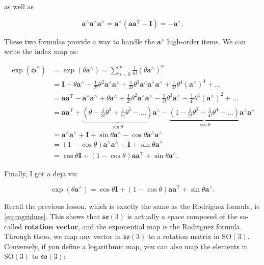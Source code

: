 as well as

\begin{equation}
\bm{a}^{\wedge} \bm{a}^{\wedge} \bm{a}^{\wedge} = \bm{a}^\wedge (\bm{a}\bm{a}^\mathrm{T}-\bm{I}) = - \bm{a}^{\wedge}.
\end{equation}

These two formulas provide a way to handle the $\bm{a}^\wedge$ high-order items. We can write the index map as:

\begin{align*}
\exp \left( {{\boldsymbol{\phi} ^ \wedge }} \right) &= \exp \left( {\theta {\bm{a}^ \wedge }} \right) = \sum\limits_{n = 0}^\infty  {\frac{1}{{n!}}{{\left( {\theta {\bm{a}^ \wedge }} \right)}^n}} \\
&= \bm{I} + \theta {\bm{a}^ \wedge } + \frac{1}{{2!}}{\theta ^2}{\bm{a}^ \wedge }{\bm{a}^ \wedge } + \frac{1}{{3!}}{\theta ^3}{\bm{a}^ \wedge }{\bm{a}^ \wedge }{\bm{a}^ \wedge } + \frac{1}{{4!}}{\theta ^4}{\left( {{\bm{a}^ \wedge }} \right)^4} + ...\\
&= \bm{a} {\bm{a}^\mathrm{T}} - {\bm{a}^ \wedge }{\bm{a}^ \wedge } + \theta {\bm{a}^ \wedge } + \frac{1}{{2!}}\theta^2 {\bm{a}^ \wedge }{\bm{a}^ \wedge } - \frac{1}{{3!}}{\theta ^3}{\bm{a}^ \wedge } - \frac{1}{{4!}}{\theta ^4}{\left( {{\bm{a}^ \wedge }} \right)^2} + ...\\
&= \bm{a}{\bm{a}^\mathrm{T}} + \underbrace{\left( {\theta  - \frac{1}{{3!}}{\theta ^3} + \frac{1}{{5!}}{\theta ^5} - ...} \right)}_{\sin \theta} {\bm{a}^ \wedge } - \underbrace{\left( {1 - \frac{1}{{2!}}{\theta ^2} + \frac{1}{{4!}}{\theta ^4} - ...} \right)}_{\cos \theta}{\bm{a}^ \wedge }{\bm{a}^ \wedge }\\
&= {\bm{a}^ \wedge }{\bm{a}^ \wedge } + \bm{I} + \sin \theta {\bm{a}^ \wedge } - \cos \theta {\bm{a}^ \wedge }{\bm{a}^ \wedge }\\
&= (1 - \cos \theta ){\bm{a}^ \wedge }{\bm{a}^ \wedge } + \bm{I} + \sin \theta {\bm{a}^ \wedge }\\
&= \cos \theta \bm{I} + (1 - \cos \theta )\bm{a}{\bm{a}^\mathrm{T}} + \sin \theta {\bm{a}^ \wedge }.
\end{align*}

Finally, I got a deja vu:

\begin{equation}
\exp( \theta \bm{a}^\wedge ) = \cos \theta \bm{I} + (1 - \cos \theta )\bm{a}{\bm{a}^\mathrm{T}} + \sin \theta {\bm{a}^ \wedge }.
\end{equation}

Recall the previous lesson, which is exactly the same as the Rodriguez formula, ie \eqref{eq:rogridues}. This shows that $\mathfrak{so}(3)$ is actually a space composed of the so-called \textbf{rotation vector}, and the exponential map is the Rodriguez formula. Through them, we map any vector in $\mathfrak{so}(3)$ to a rotation matrix in $\mathrm{SO}(3)$. Conversely, if you define a logarithmic map, you can also map the elements in $\mathrm{SO}(3)$ to $\mathfrak{so}(3)$:

